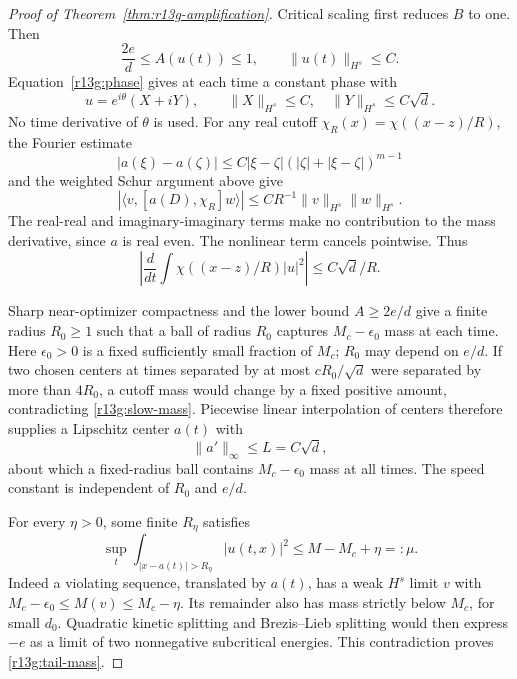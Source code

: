 \begin{proof}[Proof of Theorem~\ref{thm:r13g-amplification}]
Critical scaling first reduces $B$ to one. Then
\[
 \frac{2e}{d}\le A(u(t))\le1,\qquad
 \|u(t)\|_{H^s}\le C.
\]
Equation~\eqref{r13g:phase} gives at each time a constant phase with
\[
 u=e^{i\theta}(X+iY),\qquad
 \|X\|_{H^s}\le C,\quad \|Y\|_{H^s}\le C\sqrt d.
\]
No time derivative of $\theta$ is used. For any real cutoff
$\chi_R(x)=\chi((x-z)/R)$, the Fourier estimate
\[
 |a(\xi)-a(\zeta)|
 \le C|\xi-\zeta|(|\zeta|+|\xi-\zeta|)^{m-1}
\]
and the weighted Schur argument above give
\[
 |\langle v,[a(D),\chi_R]w\rangle|
 \le CR^{-1}\|v\|_{H^s}\|w\|_{H^s}.
\]
The real-real and imaginary-imaginary terms make no contribution to
the mass derivative, since $a$ is real even. The nonlinear term
cancels pointwise. Thus
\begin{equation}\label{r13g:slow-mass}
 \left|\frac d{dt}\int\chi((x-z)/R)|u|^2\right|
 \le C\sqrt d/R.
\end{equation}

Sharp near-optimizer compactness and the lower bound $A\ge2e/d$
give a finite radius $R_0\ge1$ such that a ball of radius $R_0$
captures $M_c-\epsilon_0$ mass at each time. Here $\epsilon_0>0$
is a fixed sufficiently small fraction of $M_c$; $R_0$ may depend
on $e/d$. If two chosen centers at times separated by at most
$cR_0/\sqrt d$ were separated by more than $4R_0$, a cutoff mass
would change by a fixed positive amount, contradicting
\eqref{r13g:slow-mass}. Piecewise linear interpolation of centers
therefore supplies a Lipschitz center $a(t)$ with
\begin{equation}\label{r13g:center-speed}
 \|a'\|_\infty\le L=C\sqrt d,
\end{equation}
about which a fixed-radius ball contains $M_c-\epsilon_0$ mass
at all times. The speed constant is independent of $R_0$ and $e/d$.

For every $\eta>0$, some finite $R_\eta$ satisfies
\begin{equation}\label{r13g:tail-mass}
 \sup_t\int_{|x-a(t)|>R_\eta}|u(t,x)|^2
 \le M-M_c+\eta=:\mu.
\end{equation}
Indeed a violating sequence, translated by $a(t)$, has a weak $H^s$
limit $v$ with $M_c-\epsilon_0\le M(v)\le M_c-\eta$.
Its remainder also has mass strictly below $M_c$, for small $d_0$.
Quadratic kinetic splitting and Brezis--Lieb splitting would then
express $-e$ as a limit of two nonnegative subcritical energies.
This contradiction proves \eqref{r13g:tail-mass}.


\end{proof}
